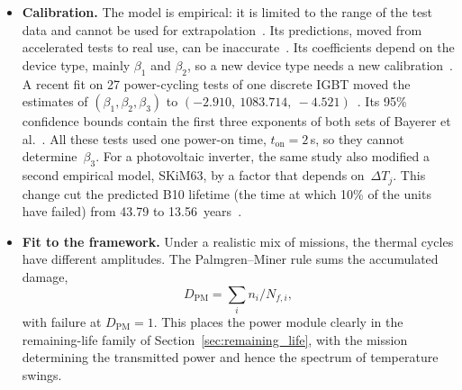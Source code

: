\documentclass[11pt,a4paper]{article}
\theoremstyle{plain}
\theoremstyle{definition}
\theoremstyle{remark}
\begin{document}
\begin{itemize}
\begin{itemize}
      \item with $T_j$ the maximum junction temperature of the cycle,
        \begin{equation}
          \beta = (-3.483,\ 1917,\ -0.438,\ -0.717,\ -0.751,\ -0.564);
        \end{equation}
      \item with $T_j$ the minimum (starting) junction temperature, which removes a correlation between the variables~\cite[Sec.~3.4]{Bayerer2008},
        \begin{equation}
          \beta = (-4.416,\ 1285,\ -0.463,\ -0.716,\ -0.761,\ -0.5).
        \end{equation}
    \end{itemize}
    In both sets every exponent is negative except $\beta_2 > 0$.
    The authors note that the relation of the voltage factor to the chip thickness does not apply to modules for traction applications, whose setup and bonding differ~\cite[Sec.~3.1]{Bayerer2008}.
  \item \textbf{Calibration.}
    The model is empirical: it is limited to the range of the test data and cannot be used for extrapolation~\cite[Secs.~3.1 and~3.4]{Bayerer2008}.
    Its predictions, moved from accelerated tests to real use, can be inaccurate~\cite[Sec.~4]{Alavi2024}.
    Its coefficients depend on the device type, mainly $\beta_1$ and $\beta_2$, so a new device type needs a new calibration~\cite[Secs.~1 and~4]{Alavi2024}.
    A recent fit on 27 power-cycling tests of one discrete IGBT moved the estimates of $(\beta_1,\beta_2,\beta_3)$ to $(-2.910,\ 1083.714,\ -4.521)$~\cite[Sec.~5.2, Table~2]{Alavi2024}.
    Its 95\% confidence bounds contain the first three exponents of both sets of Bayerer et al.~\cite[Table~2]{Alavi2024}.
    All these tests used one power-on time, $t_{\mathrm{on}} = 2$\,s, so they cannot determine~$\beta_3$.
    For a photovoltaic inverter, the same study also modified a second empirical model, SKiM63, by a factor that depends on~$\Delta T_j$.
    This change cut the predicted B10 lifetime (the time at which 10\% of the units have failed) from 43.79 to 13.56~years~\cite[Sec.~5.3 and Fig.~15]{Alavi2024}.
  \item \textbf{Fit to the framework.}
    Under a realistic mix of missions, the thermal cycles have different amplitudes.
    The Palmgren--Miner rule sums the accumulated damage,
    \begin{equation}
      D_{\mathrm{PM}} = \sum_i n_i/N_{f,i},
    \end{equation}
    with failure at $D_{\mathrm{PM}} = 1$.
    This places the power module clearly in the remaining-life family of Section~\ref{sec:remaining_life}, with the mission determining the transmitted power and hence the spectrum of temperature swings.
\end{itemize}
\end{document}
